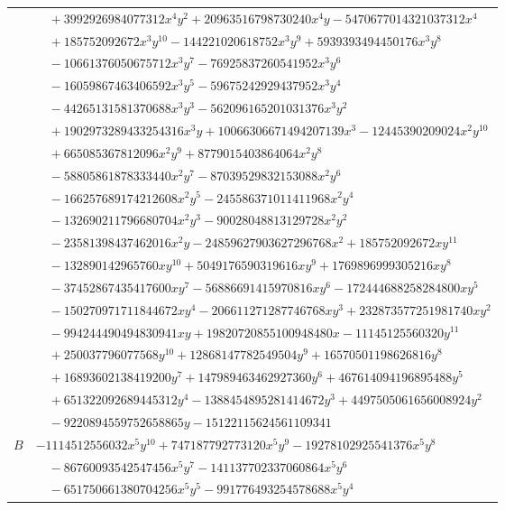 \documentclass[11pt]{article}
\begin{document}
\begin{longtable}{@{}ll@{}}
 & $\quad +3992926984077312x^{4}y^{2}+20963516798730240x^{4}y-5470677014321037312x^{4}$\\
 & $\quad +185752092672x^{3}y^{10}-144221020618752x^{3}y^{9}+5939393494450176x^{3}y^{8}$\\
 & $\quad -10661376050675712x^{3}y^{7}-76925837260541952x^{3}y^{6}$\\
 & $\quad -16059867463406592x^{3}y^{5}-59675242929437952x^{3}y^{4}$\\
 & $\quad -44265131581370688x^{3}y^{3}-562096165201031376x^{3}y^{2}$\\
 & $\quad +1902973289433254316x^{3}y+10066306671494207139x^{3}-12445390209024x^{2}y^{10}$\\
 & $\quad +665085367812096x^{2}y^{9}+8779015403864064x^{2}y^{8}$\\
 & $\quad -58805861878333440x^{2}y^{7}-87039529832153088x^{2}y^{6}$\\
 & $\quad -166257689174212608x^{2}y^{5}-245586371011411968x^{2}y^{4}$\\
 & $\quad -132690211796680704x^{2}y^{3}-90028048813129728x^{2}y^{2}$\\
 & $\quad -23581398437462016x^{2}y-24859627903627296768x^{2}+185752092672xy^{11}$\\
 & $\quad -132890142965760xy^{10}+5049176590319616xy^{9}+1769896999305216xy^{8}$\\
 & $\quad -37452867435417600xy^{7}-56886691415970816xy^{6}-172444688258284800xy^{5}$\\
 & $\quad -150270971711844672xy^{4}-206611271287746768xy^{3}+232873577251981740xy^{2}$\\
 & $\quad -994244490494830941xy+19820720855100948480x-11145125560320y^{11}$\\
 & $\quad +250037796077568y^{10}+12868147782549504y^{9}+16570501198626816y^{8}$\\
 & $\quad +16893602138419200y^{7}+147989463462927360y^{6}+467614094196895488y^{5}$\\
 & $\quad +651322092689445312y^{4}-1388454895281414672y^{3}+4497505061656008924y^{2}$\\
 & $\quad -9220894559752658865y-15122115624561109341$\\
$B$ & $-1114512556032x^{5}y^{10}+747187792773120x^{5}y^{9}-19278102925541376x^{5}y^{8}$\\
 & $\quad -86760093542547456x^{5}y^{7}-141137702337060864x^{5}y^{6}$\\
 & $\quad -651750661380704256x^{5}y^{5}-991776493254578688x^{5}y^{4}$\\

\end{longtable}
\end{document}
